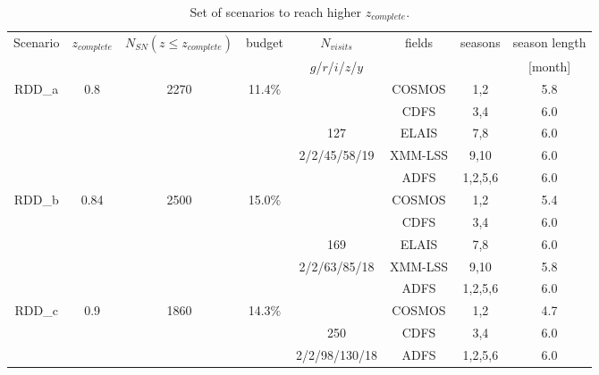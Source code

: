 \documentclass[\docopts]{\docclass}
\newcommand{\bg}{{$g$}}
\newcommand{\br}{{$r$}}
\newcommand{\bi}{{$i$}}
\newcommand{\bz}{{$z$}}
\newcommand{\by}{{$y$}}
\newcommand{\nsncomp}{{$N_{SN}(z\leq z_{complete})$}}
\newcommand{\zcomp}{\mbox{$z_{complete}$}}
\newcommand{\per}{$\%$}
\newcommand{\nvisits}{$N_{visits}$}
\newcommand{\ddfscen}[1]{RDD\_#1}
\begin{document}
{\begin{table}[!htbp]
  \caption{Set of scenarios to reach higher \zcomp.}\label{tab:rolling_scenarios}
  \begin{center}
    \begin{tabular}{c|c|c|c|c|c|c|c}
      \hline
      \hline
      Scenario & \zcomp & \nsncomp & budget & \nvisits & fields & seasons & season length\\
                       &                 &                     &               & \bg/\br/\bi/\bz/\by &        & & [month] \\
      \hline
      \multirow{5}{*}{\ddfscen{a}} & \multirow{5}{*}{0.8} & \multirow{5}{*}{2270} & \multirow{5}{*}{11.4\per} & & COSMOS & 1,2 & 5.8 \\
         &       &          &                  &          & CDFS         & 3,4 & 6.0 \\
         &       &          &                  &      127               & ELAIS        & 7,8 & 6.0 \\
         &       &          &                  &    2/2/45/58/19                  &XMM-LSS  & 9,10 & 6.0 \\
         &       &          &                  &                     &ADFS          & 1,2,5,6 & 6.0 \\
      \hline
      \multirow{5}{*}{\ddfscen{b}} & \multirow{5}{*}{0.84} & \multirow{5}{*}{2500} & \multirow{5}{*}{15.0\per} & & COSMOS & 1,2 & 5.4\\
         &       &          &                  &          & CDFS         & 3,4 & 6.0 \\
         &       &          &                  &      169               & ELAIS        & 7,8 & 6.0 \\
         &       &          &                  &    2/2/63/85/18                  &XMM-LSS  & 9,10 & 5.8\\
         &       &          &                  &                     &ADFS          & 1,2,5,6 & 6.0 \\
      \hline
      \multirow{3}{*}{\ddfscen{c}} & \multirow{3}{*}{0.9} & \multirow{3}{*}{1860} & \multirow{3}{*}{14.3\per} & & COSMOS & 1,2 & 4.7 \\
         &       &          &                  &     250     & CDFS         & 3,4 & 6.0 \\
         &       &          &                  &    2/2/98/130/18                 &ADFS          & 1,2,5,6 & 6.0 \\
      \hline
      \end{tabular}
  \end{center}
\end{table}



}
\end{document}
